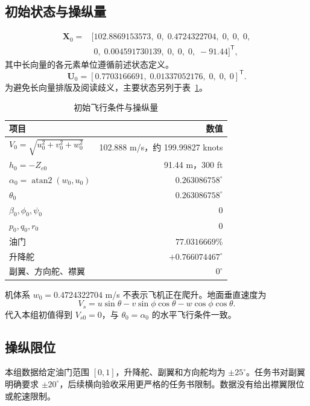 \documentclass[UTF8,a4paper,11pt,fontset=windows]{ctexart}
\begin{document}
\subsection{初始状态与操纵量}
\begin{equation}
\begin{aligned}
\bm X_0={}&[102.8869153573,\;0,\;0.4724322704,\;0,\;0,\;0,\\
 &\phantom{[}0,\;0.004591730139,\;0,\;0,\;0,\;-91.44]^{\mathsf T},
\end{aligned}
\end{equation}
其中长向量的各元素单位遵循前述状态定义。
\begin{equation}
\bm U_0=[0.7703166691,\;0.01337052176,\;0,\;0,\;0]^{\mathsf T}.
\end{equation}
为避免长向量排版及阅读歧义，主要状态另列于表~\ref{tab:trimpoint}。
\begin{table}[H]\centering
\caption{初始飞行条件与操纵量}\label{tab:trimpoint}
\begin{tabular}{lr}\toprule
项目&数值\\\midrule
$V_0=\sqrt{u_0^2+v_0^2+w_0^2}$&102.888 m/s，约 199.99827 knots\\
$h_0=-Z_{e0}$&91.44 m，300 ft\\
$\alpha_0=\operatorname{atan2}(w_0,u_0)$&$0.263086758^\circ$\\
$\theta_0$&$0.263086758^\circ$\\
$\beta_0,\phi_0,\psi_0$&$0$\\
$p_0,q_0,r_0$&$0$\\
油门&$77.0316669\%$\\
升降舵&$+0.766074467^\circ$\\
副翼、方向舵、襟翼&$0^\circ$\\\bottomrule
\end{tabular}
\end{table}

机体系 $w_0=0.4724322704$ m/s 不表示飞机正在爬升。地面垂直速度为
\begin{equation}\label{eq:vs}
V_s=u\sin\theta-v\sin\phi\cos\theta-w\cos\phi\cos\theta.
\end{equation}
代入本组初值得到 $V_{s0}=0$，与 $\theta_0=\alpha_0$ 的水平飞行条件一致。

\subsection{操纵限位}
本组数据给定油门范围 $[0,1]$，升降舵、副翼和方向舵均为 $\pm25^\circ$。任务书对副翼明确要求 $\pm20^\circ$，后续横向验收采用更严格的任务书限制。数据没有给出襟翼限位或舵速限制。
\end{document}
